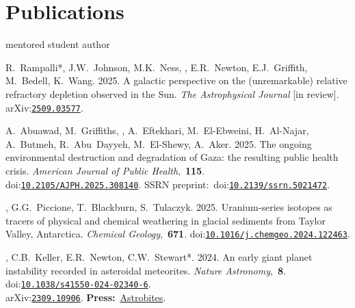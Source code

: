\section{Publications}
\hfill* mentored student author
\newcommand{\inprep}[1]{\textit{#1} [in prep.]}
\newcommand{\submitted}[1]{\textit{#1} [submitted]}
\newcommand{\inreview}[1]{\textit{#1} [in review]}
\newcommand{\inpress}[1]{\textit{#1} [in press]}
\newcommand{\doi}[1]{doi:\href{https://doi.org/#1}{\texttt{#1}}}
\newcommand{\arxiv}[1]{arXiv:\href{https://arxiv.org/abs/#1}{\texttt{#1}}}
\newcommand{\press}[2]{\textbf{Press:}~\href{#1}{#2}}
\newcommand{\pub}[2]{\textit{#1},~\textbf{#2}}

\begin{etaremune} [itemsep=4pt, leftmargin=3ex]
    \item R.~Rampalli*, J.W.~Johnson, M.K.~Ness, \ghedwards, E.R.~Newton, E.J.~Griffith, M.~Bedell, K.~Wang. 2025. A galactic perspective on the (unremarkable) relative refractory depletion observed in the Sun. \inreview{The Astrophysical Journal}. \arxiv{2509.03577}.

    \item A.~Abuawad, M.~Griffiths, \ghedwards, A.~Eftekhari, M.~El-Ebweini, H.~Al-Najar, A.~Butmeh, R.~Abu~Dayyeh, M.~El-Shewy, A.~Aker. 2025. The ongoing environmental destruction and degradation of Gaza: the resulting public health crisis. \pub{American Journal of Public Health}{115}. \\\doi{10.2105/AJPH.2025.308140}. SSRN preprint:~\doi{10.2139/ssrn.5021472}.
 
    \item \ghedwards, G.G.~Piccione, T.~Blackburn,  S.~Tulaczyk. 2025. Uranium-series isotopes as tracers of physical and chemical weathering in glacial sediments from Taylor Valley, Antarctica. \pub{Chemical Geology}{671}. \doi{10.1016/j.chemgeo.2024.122463}.
        
    \item \ghedwards, C.B.~Keller, E.R.~Newton, C.W.~Stewart*. 2024. An early giant planet instability recorded in asteroidal meteorites. \pub{Nature Astronomy}{8}. \doi{10.1038/s41550-024-02340-6}. \\\arxiv{2309.10906}. \press{https://astrobites.org/2023/09/25/meteorites-planet-migration/}{Astrobites}.
    

\end{etaremune}
